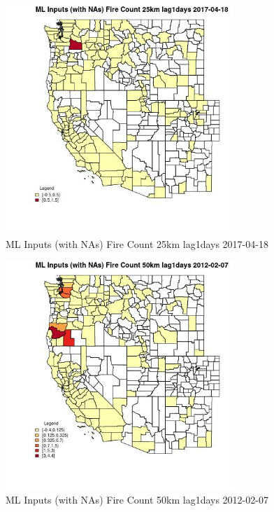 \begin{figure} 
\centering  
\includegraphics[width=0.77\textwidth]{Code_Outputs/Report_ML_input_PM25_Step4_part_f_de_duplicated_aveswNAs_CountyFire_Count_25km_lag1daysMean2017-04-18.jpg} 
\caption{\label{fig:Report_ML_input_PM25_Step4_part_f_de_duplicated_aveswNAsCountyFire_Count_25km_lag1daysMean2017-04-18}ML Inputs (with NAs) Fire Count 25km lag1days 2017-04-18} 
\end{figure} 
 

\clearpage 

\begin{figure} 
\centering  
\includegraphics[width=0.77\textwidth]{Code_Outputs/Report_ML_input_PM25_Step4_part_f_de_duplicated_aveswNAs_CountyFire_Count_50km_lag1daysMean2012-02-07.jpg} 
\caption{\label{fig:Report_ML_input_PM25_Step4_part_f_de_duplicated_aveswNAsCountyFire_Count_50km_lag1daysMean2012-02-07}ML Inputs (with NAs) Fire Count 50km lag1days 2012-02-07} 
\end{figure} 
 

